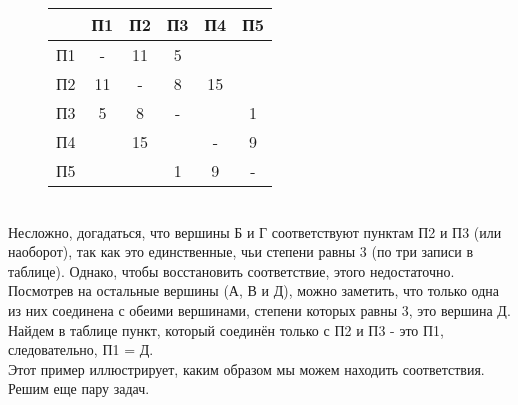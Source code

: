 \documentclass[12pt]{article}
\theoremstyle{problem_style}
\begin{document}
\begin{figure}[h]
    \centering
    \begin{minipage}[t!]{0.45\textwidth}
        \centering
        \begin{tabular}{|c|c|c|c|c|c|} \hline
             & П1 & П2 & П3 & П4 & П5\\ \hline
            П1 & - & 11 & 5 & & \\ \hline
            П2 & 11 & - & 8 & 15 & \\ \hline
            П3 & 5 & 8 & - & & 1\\ \hline
            П4 &  & 15 &  & - & 9\\ \hline
            П5 &  &  & 1 & 9 & -\\ \hline
        \end{tabular}
    \end{minipage}
    \hfill
    \begin{minipage}[t!]{0.45\textwidth}
        \centering
    \end{minipage}
\end{figure}\\
Несложно, догадаться, что вершины Б и Г соответствуют пунктам П2 и П3 (или наоборот), так как это единственные, чьи степени равны 3 (по три записи в таблице). Однако, чтобы восстановить соответствие, этого недостаточно. Посмотрев на остальные вершины (А, В и Д), можно заметить, что только одна из них соединена с обеими вершинами, степени которых равны 3, это вершина Д. Найдем в таблице пункт, который соединён только с П2 и П3 - это П1, следовательно, П1 = Д.\\
Этот пример иллюстрирует, каким образом мы можем находить соответствия. Решим еще пару задач.
\end{document}
